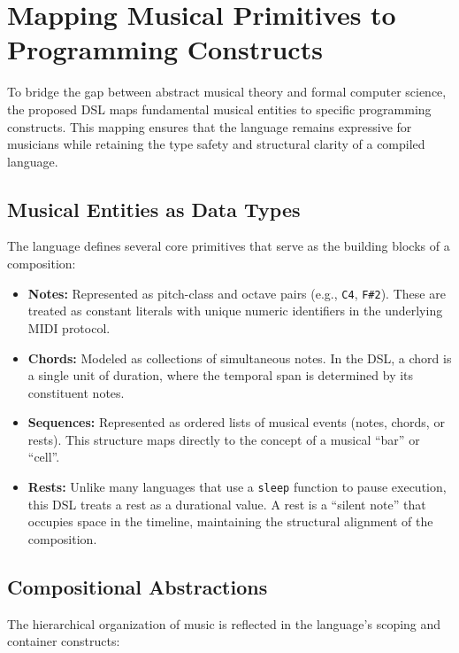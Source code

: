 \section{Mapping Musical Primitives to Programming Constructs}\label{sec:musical-mapping}

To bridge the gap between abstract musical theory and formal computer science, the proposed DSL maps fundamental musical
entities to specific programming constructs.
This mapping ensures that the language remains expressive for musicians while retaining the type safety and structural
clarity of a compiled language.

\subsection{Musical Entities as Data Types}\label{subsec:musical-entities-as-data-types}

The language defines several core primitives that serve as the building blocks of a composition:
\begin{itemize}
  \item \textbf{Notes:} Represented as pitch-class and octave pairs (e.g., \texttt{C4}, \texttt{F\#2}).
    These are treated as constant literals with unique numeric identifiers in the underlying MIDI protocol.
  \item \textbf{Chords:} Modeled as collections of simultaneous notes.
    In the DSL, a chord is a single unit of duration, where the temporal span is determined by its constituent notes.
  \item \textbf{Sequences:} Represented as ordered lists of musical events (notes, chords, or rests).
    This structure maps directly to the concept of a musical ``bar'' or ``cell''.
  \item \textbf{Rests:} Unlike many languages that use a \texttt{sleep} function to pause execution, this DSL treats a
    rest as a durational value.
    A rest is a ``silent note'' that occupies space in the timeline, maintaining the structural alignment of the
    composition.
\end{itemize}

\subsection{Compositional Abstractions}\label{subsec:compositional-abstractions}

The hierarchical organization of music is reflected in the language's scoping and container constructs:

